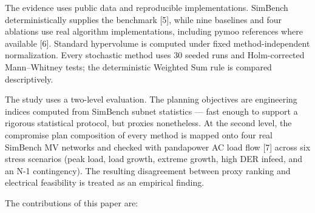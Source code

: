 \documentclass[
  10pt,
  a4paper,
]{article}
\begin{document}
The evidence uses public data and reproducible implementations. SimBench
deterministically supplies the benchmark {[}5{]}, while nine baselines
and four ablations use real algorithm implementations, including pymoo
references where available {[}6{]}. Standard hypervolume is computed
under fixed method-independent normalization. Every stochastic method
uses 30 seeded runs and Holm-corrected Mann--Whitney tests; the
deterministic Weighted Sum rule is compared descriptively.

The study uses a two-level evaluation. The planning objectives are
engineering indices computed from SimBench subnet statistics --- fast
enough to support a rigorous statistical protocol, but proxies
nonetheless. At the second level, the compromise plan composition of
every method is mapped onto four real SimBench MV networks and checked
with pandapower AC load flow {[}7{]} across six stress scenarios (peak
load, load growth, extreme growth, high DER infeed, and an N-1
contingency). The resulting disagreement between proxy ranking and
electrical feasibility is treated as an empirical finding.

The contributions of this paper are:
\end{document}
